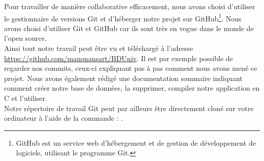 Pour travailler de manière collaborative efficacement, nous avons choisi d'utiliser le gestionnaire de versions Git et d'héberger notre projet sur GitHub\footnote{GitHub est un service web d'hébergement et de gestion de développement de logiciels, utilisant le programme Git.}. Nous avons choisi d'utiliser Git et GitHub car ils sont très en vogue dans le monde de l'open source.\\ 

Ainsi tout notre travail peut être vu et téléchargé à l'adresse \url{https://github.com/manonansart/BDUniv}. Il est par exemple possible de regarder nos commits, ceux-ci expliquant pas à pas comment nous avons mené ce projet. Nous avons également rédigé une documentation sommaire indiquant comment créer notre base de données, la supprimer, compiler notre application en C et l'utiliser.\\ 

Notre répertoire de travail Git peut par ailleurs être directement cloné sur votre ordinateur à l'aide de la commande : .